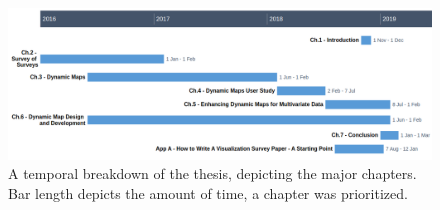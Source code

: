 \begin{figure}
\includegraphics[width=1\textwidth]{images/ch1/ganttChart.png}
\caption{A temporal breakdown of the thesis, depicting the major chapters. Bar length depicts the amount of time, a chapter was prioritized.} \label{fig:gantt}
\end{figure}
